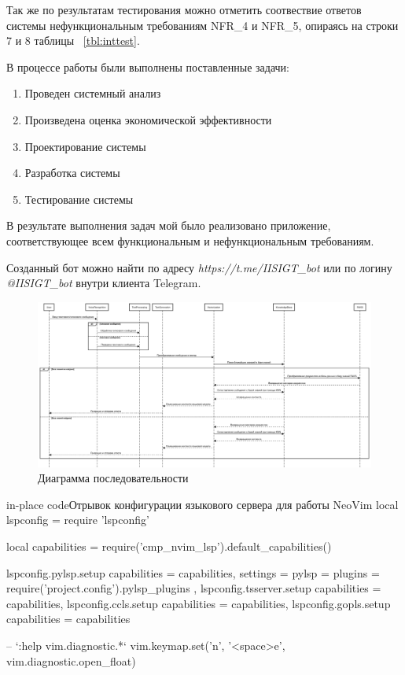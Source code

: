 Так же по результатам тестирования можно отметить соотвествие ответов системы
нефункциональным требованиям NFR\_4 и NFR\_5, опираясь на строки 7 и 8 таблицы
~\ref{tbl:inttest}.


В процессе работы были выполнены поставленные задачи:

\begin{enumerate}
    \item Проведен системный анализ
    \item Произведена оценка экономической эффективности
    \item Проектирование системы
    \item Разработка системы
    \item Тестирование системы
\end{enumerate}

В результате выполнения
задач мой было реализовано приложение, соответствующее всем функциональным и
нефункциональным требованиям.

Созданный бот можно найти по адресу \emph{https://t.me/IISIGT\_bot} или по логину 
\emph{@IISIGT\_bot} внутри клиента Telegram.

\showbib


\begin{figure}[H]
    \centering
    \includegraphics[width=1.2\textwidth, angle=90]{Диаграмма последовательности.png}
    \caption{Диаграмма последовательности}\label{Диаграмма последовательности.png}
\end{figure}


\begin{codepiece}{in-place code}{Отрывок конфигурации языкового сервера для работы NeoVim}
local lspconfig = require 'lspconfig'

local capabilities = require('cmp_nvim_lsp').default_capabilities()

lspconfig.pylsp.setup {
  capabilities = capabilities,
  settings = { pylsp = { plugins = require('project.config').pylsp_plugins } },
}
lspconfig.tsserver.setup {
  capabilities = capabilities,
}
lspconfig.ccls.setup {
  capabilities = capabilities,
}
lspconfig.gopls.setup {
  capabilities = capabilities
}

-- `:help vim.diagnostic.*`
vim.keymap.set('n', '<space>e', vim.diagnostic.open_float)
\end{codepiece}

